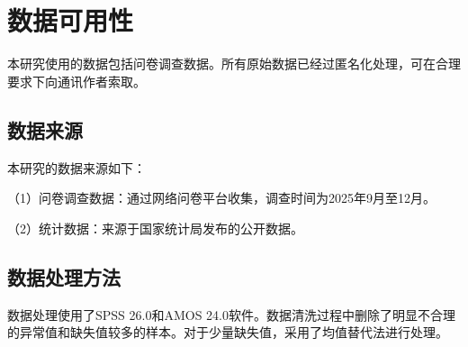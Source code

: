 
\chapter{数据可用性}

本研究使用的数据包括问卷调查数据。所有原始数据已经过匿名化处理，可在合理要求下向通讯作者索取。

\section{数据来源}

本研究的数据来源如下：

（1）问卷调查数据：通过网络问卷平台收集，调查时间为2025年9月至12月。

（2）统计数据：来源于国家统计局发布的公开数据。

\section{数据处理方法}

数据处理使用了SPSS 26.0和AMOS 24.0软件。数据清洗过程中删除了明显不合理的异常值和缺失值较多的样本。对于少量缺失值，采用了均值替代法进行处理。
